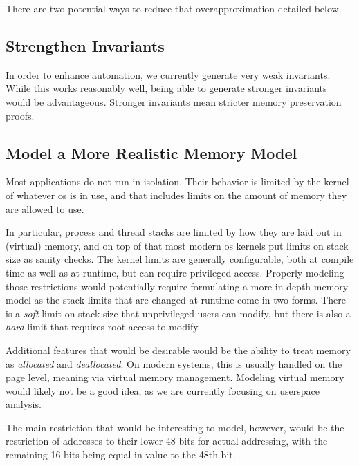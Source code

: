 There are two potential ways to reduce that overapproximation detailed below.

\subsection{Strengthen Invariants}
In order to enhance automation, we currently generate very weak invariants.
While this works reasonably well, being able to generate stronger invariants
would be advantageous. Stronger invariants mean stricter memory preservation proofs.


\subsection{Model a More Realistic Memory Model}
Most applications do not run in isolation. Their behavior is limited by
the kernel of whatever \ac{os} is in use,
and that includes limits on the amount of memory they are allowed to use.

In particular, process and thread stacks are limited
by how they are laid out in (virtual) memory, and on top of that
most modern \ac{os} kernels put limits on stack size as sanity checks.
The kernel limits are generally configurable,
both at compile time as well as at runtime, but can require privileged access.
Properly modeling those restrictions
would potentially require formulating a more in-depth memory model
as the stack limits that are changed at runtime come in two forms.
There is a \emph{soft} limit on stack size that unprivileged users
can modify, but there is also a \emph{hard} limit
that requires root access to modify.

Additional features that would be desirable
would be the ability to treat memory as \emph{allocated} and \emph{deallocated}.
On modern systems, this is usually handled on the page level,
meaning via virtual memory management.
Modeling virtual memory would likely not be a good idea,
as we are currently focusing on userspace analysis.

The main restriction that would be interesting to model, however,
would be the restriction of addresses to their lower 48 bits for actual addressing,
with the remaining 16 bits being equal in value to the 48th bit.
